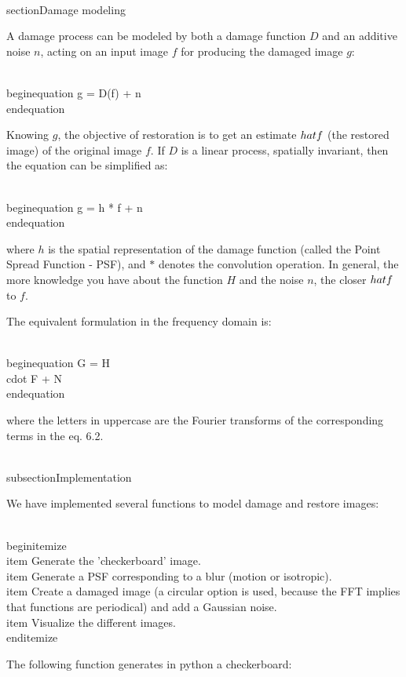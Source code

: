 \\section{Damage modeling}

A damage process can be modeled by both a damage function $D$ and an additive noise $n$, acting on an input image $f$ for producing the damaged image $g$:

\\begin{equation}
g = D(f) + n
\\end{equation}

Knowing $g$, the objective of restoration is to get an estimate $\\hat{f}$ (the restored image) of the original image $f$. If $D$ is a linear process, spatially invariant, then the equation can be simplified as:

\\begin{equation}
g = h * f + n
\\end{equation}

where $h$ is the spatial representation of the damage function (called the Point Spread Function - PSF), and $*$ denotes the convolution operation. In general, the more knowledge you have about the function $H$ and the noise $n$, the closer $\\hat{f}$ to $f$.

The equivalent formulation in the frequency domain is:

\\begin{equation}
G = H\\cdot F + N
\\end{equation}

where the letters in uppercase are the Fourier transforms of the corresponding terms in the eq. 6.2.

\\subsection{Implementation}

We have implemented several functions to model damage and restore images:

\\begin{itemize}
\\item Generate the 'checkerboard' image.
\\item Generate a PSF corresponding to a blur (motion or isotropic).
\\item Create a damaged image (a circular option is used, because the FFT implies that functions are periodical) and add a Gaussian noise.
\\item Visualize the different images.
\\end{itemize}

The following function generates in python a checkerboard:

